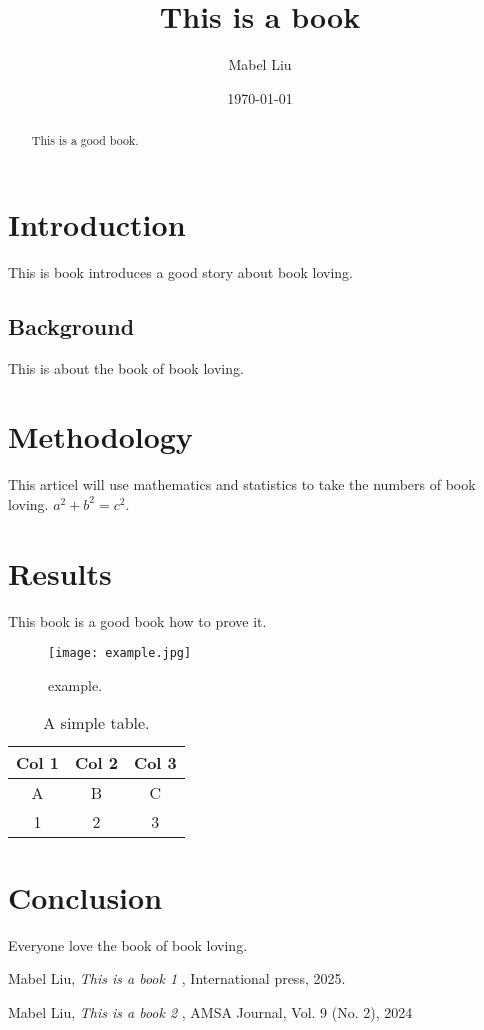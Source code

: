 \documentclass[a4paper,12pt]{article} %
\title{This is a book}
\author{Mabel Liu}
\date{\today}               %
\begin{document}
\maketitle  %

\begin{abstract}
This is a good book.
\end{abstract}

\section{Introduction}
This is book introduces a good story about book loving.
\subsection{Background}
This is about the book of book loving.
\section{Methodology}
This articel will use mathematics and statistics to take the numbers of book loving.
\( a^2 + b^2 = c^2 \).
\section{Results}
This book is a good book how to prove it.

\begin{figure}[h]
  \centering
  \texttt{[image: example.jpg]}
  \caption{example.}
  \label{fig:sample}
\end{figure}

\begin{table}[h]
\centering
\begin{tabular}{|c|c|c|}
\hline
Col 1 & Col 2 & Col 3 \\
\hline
A & B & C \\
\hline
1&2&3\\
\hline
\end{tabular}
\caption{A simple table.}
\end{table}
\section{Conclusion}
Everyone love the book of book loving.

\begin{thebibliography}{9}
 Mabel Liu, \textit{This is a book 1 }, International press, 2025.

 Mabel Liu, \textit{This is a book 2 }, AMSA Journal, Vol. 9 (No. 2), 2024

\end{thebibliography}
\end{document}
